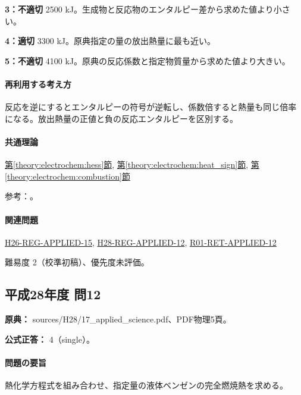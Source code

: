 \noindent\textbf{3：不適切} 2500 kJ。生成物と反応物のエンタルピー差から求めた値より小さい。\par

\noindent\textbf{4：適切} 3300 kJ。原典指定の量の放出熱量に最も近い。\par

\noindent\textbf{5：不適切} 4100 kJ。原典の反応係数と指定物質量から求めた値より大きい。\par

\paragraph{再利用する考え方} 反応を逆にするとエンタルピーの符号が逆転し、係数倍すると熱量も同じ倍率になる。放出熱量の正値と負の反応エンタルピーを区別する。

\paragraph{共通理論} \hyperref[theory:electrochem:hess]{第\ref*{theory:electrochem:hess}節}, \hyperref[theory:electrochem:heat_sign]{第\ref*{theory:electrochem:heat_sign}節}, \hyperref[theory:electrochem:combustion]{第\ref*{theory:electrochem:combustion}節}

\par 参考：\cite{openstax_hess}。

\paragraph{関連問題} \hyperref[q:h26-reg-applied-15]{H26-REG-APPLIED-15}, \hyperref[q:h28-reg-applied-12]{H28-REG-APPLIED-12}, \hyperref[q:r01-ret-applied-12]{R01-RET-APPLIED-12}

\par 難易度 2（校準初稿）、優先度未評価。

\subsection{平成28年度 問12}
\label{q:h28-reg-applied-12}

\noindent\textbf{原典：} sources/H28/17\_applied\_science.pdf、PDF物理5頁。

\textbf{公式正答：} 4（single）。

\paragraph{問題の要旨} 熱化学方程式を組み合わせ、指定量の液体ベンゼンの完全燃焼熱を求める。

